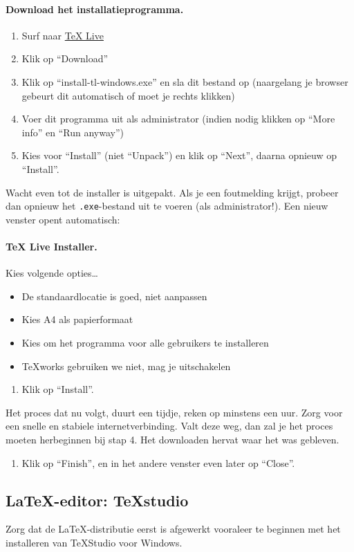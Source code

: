 \documentclass[kulak]{kulakarticle} %
\begin{document}
\paragraph{Download het installatieprogramma.}
\begin{enumerate}
	\item Surf naar \href{http://www.tug.org/texlive/}{TeX Live}
	\item Klik op ``Download''
	\item Klik op ``install-tl-windows.exe'' en sla dit bestand op (naargelang je browser gebeurt dit automatisch of moet je rechts klikken)
	\item Voer dit programma uit als administrator (indien nodig klikken op ``More info'' en ``Run anyway'')
	\item Kies voor ``Install'' (niet ``Unpack'') en klik op ``Next'', daarna opnieuw op ``Install''.
\end{enumerate}
Wacht even tot de installer is uitgepakt. Als je een foutmelding krijgt, probeer dan opnieuw het \texttt{.exe}-bestand uit te voeren (als administrator!). Een nieuw venster  opent automatisch:
\paragraph{TeX Live Installer.} Kies volgende opties\ldots
\begin{itemize}
	\item De standaardlocatie is goed, niet aanpassen
	\item Kies A4 als papierformaat
	\item Kies om het programma voor alle gebruikers te installeren
	\item TeXworks gebruiken we niet, mag je uitschakelen
\end{itemize}
\begin{enumerate}[resume]
	\item Klik op ``Install''.
\end{enumerate}
Het proces dat nu volgt, duurt een tijdje, reken op minstens een uur. Zorg voor een snelle en stabiele internetverbinding. Valt deze weg, dan zal je het proces moeten herbeginnen bij stap 4. Het downloaden hervat waar het was gebleven.
\begin{enumerate}[resume]
	\item Klik op ``Finish'', en in het andere venster even later op ``Close''.
\end{enumerate}

\subsection{\LaTeX-editor: TeXstudio}
Zorg dat de \LaTeX-distributie eerst is afgewerkt vooraleer te beginnen met het installeren van TeXStudio voor Windows.
\end{document}

